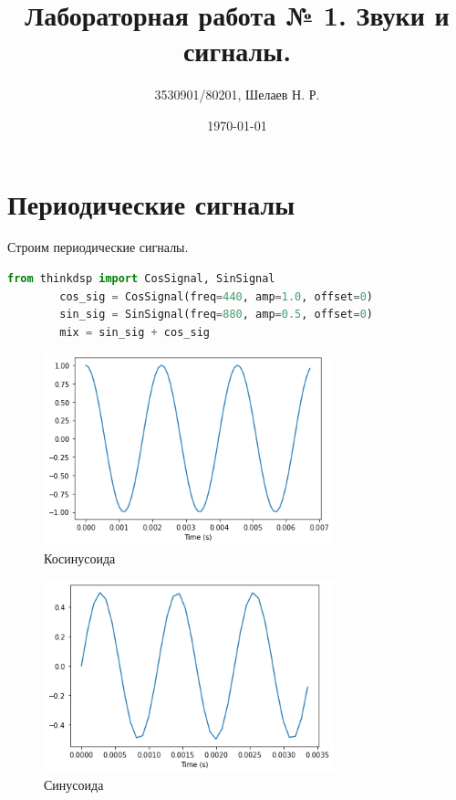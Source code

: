\documentclass[a4paper, 12pt]{report}
\author{3530901/80201, Шелаев Н. Р.}
\title{Лабораторная работа № 1. Звуки и сигналы.}
\date{\today}
\begin{document}
	\maketitle
	\tableofcontents
	\listoffigures
	\lstlistoflistings

	\chapter{Периодические сигналы}
	Строим периодические сигналы.
	\begin{lstlisting}[language=Python,caption=Построение сигнала \texttt{Cos} и  \texttt{Sin} и их суммы]
		from thinkdsp import CosSignal, SinSignal
		cos_sig = CosSignal(freq=440, amp=1.0, offset=0)
		sin_sig = SinSignal(freq=880, amp=0.5, offset=0)
		mix = sin_sig + cos_sig
	\end{lstlisting}
	\begin{figure}[H]
		\centering
		\includegraphics[width=0.75\textwidth]{cos.png}
		\caption{Косинусоида}
		\label{fig:cos}
	\end{figure}
	\begin{figure}[H]
		\centering
		\includegraphics[width=0.75\textwidth]{sin.png}
		\caption{Синусоида}
		\label{fig:sin}
	\end{figure}
\end{document}
